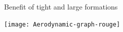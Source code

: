 \documentclass[12pt,svgnames,table,draft=false]{beamer}
\begin{document}

\usebackgroundtemplate{} 
\begin{frame}{Benefit of tight and large formations \cite{Hummel1982}}
\begin{center}
\texttt{[image: Aerodynamic-graph-rouge]}
\end{center}
\end{frame}
\end{document}
